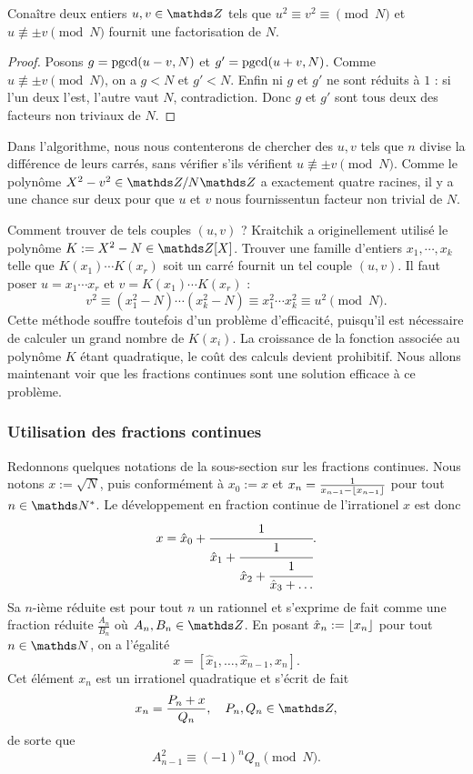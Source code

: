 \begin{lemme}
	Conaître deux entiers $u, v \in \Z$ tels que $u^2 \equiv v^2 \equiv
	\pmod{N}$ et $u\not\equiv \pm v\pmod{N}$ fournit une factorisation de $N$.
\end{lemme}

\begin{proof}
	Posons $g =\operatorname{pgcd}(u-v, N)$ et $g' = \operatorname{pgcd}(u+v, N)$. Comme $u\not\equiv \pm
	v\pmod{N}$, on a $g<N$ et $g'<N$. Enfin ni $g$ et $g'$ ne sont réduits à
	$1$ : si l'un deux l'est, l'autre vaut $N$, contradiction. Donc $g$ et $g'$
	sont tous deux des facteurs non triviaux de $N$.
\end{proof}

\begin{remarque}
	Dans l'algorithme, nous nous contenterons de chercher des $u, v$ tels que
	$n$ divise la différence de leurs carrés, sans vérifier s'ils vérifient $u
	\not\equiv \pm v\pmod{N}$. Comme le polynôme $X^2 - v^2 \in \Z/N\Z$ a
	exactement quatre racines, il y a \og{} une chance sur deux \fg pour que
	$u$ et $v$ nous fournissentun facteur non trivial de $N$. \\
\end{remarque}

Comment trouver de tels couples $(u, v)$ ? Kraitchik a originellement utilisé
le polynôme $K := X^2 - N \in \Z[X]$. Trouver une famille d'entiers $x_1,
\cdots, x_k$ telle que $K(x_1)\cdots K(x_r)$ soit un carré fournit un tel
couple $(u, v)$. Il faut poser $u = x_1\cdots x_r$ et $v = K(x_1)\cdots K(x_r)$
: \[v^2 \equiv (x_1^2 - N)\cdots (x_k^2 - N) \equiv x_1^2 \cdots x_k^2 \equiv
u^2\pmod{N}.\] Cette méthode souffre toutefois d'un problème d'efficacité,
puisqu'il est nécessaire de calculer un grand nombre de $K(x_i)$. La croissance
de la fonction associée au polynôme $K$ étant quadratique, le coût des calculs
devient prohibitif. Nous allons maintenant voir que les fractions continues
sont une solution efficace à ce problème. \\

\subsubsection{Utilisation des fractions continues}

Redonnons quelques notations de la sous-section  sur les fractions
continues. Nous notons $x := \sqrt{N}$, puis conformément à  $x_0 :=
x$ et $x_n = \frac{1}{x_{n-1}- \lfloor x_{n-1}\rfloor}$ pour tout $n\in \N^*$. Le
développement en fraction continue de l'irrationel $x$ est donc \[x = \hat{x}_0
+ \cfrac{1}{\hat{x}_1 + \cfrac{1}{\hat{x}_2 + \cfrac{1}{\hat{x}_3 + \dots}}}.\]
Sa $n$-ième réduite est pour tout $n$ un rationnel et s'exprime de fait comme
une fraction réduite $\frac{A_n}{B_n}$ où $A_n, B_n\in \Z$.  En posant
$\hat{x}_n := \lfloor x_n\rfloor$ pour tout $n\in \N$, on a l'égalité  \[x =
[\hat{x}_1, \dots, \hat{x}_{n-1}, x_n].\] Cet élément $x_n$ est un irrationel
quadratique et s'écrit de fait  \[x_n = \frac{P_n + x}{Q_n},\quad P_n,
Q_n\in \Z,\] de sorte que
\begin{equation}
	A_{n-1}^2 \equiv (-1)^n Q_n \pmod{N}.
\end{equation}

